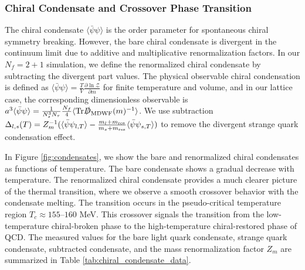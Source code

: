 \subsubsection*{Chiral Condensate and Crossover Phase Transition}
The chiral condensate $\langle \bar{\psi}\psi \rangle$ is the order parameter for spontaneous chiral symmetry breaking. However, the bare chiral condensate is divergent in the continuum limit due to additive and multiplicative renormalization factors. In our $N_f=2+1$ simulation, we define the renormalized chiral condensate by subtracting the divergent part values. The physical observable chiral condensation is defined as $\langle \bar{\psi}\psi \rangle = \frac{T}{V} \frac{\partial \ln \mathcal{Z}}{\partial m}$ for finite temperature and volume, and in our lattice case, the corresponding dimensionless observable is $a^3 \langle \bar{\psi}\psi \rangle = \frac{1}{N_s^3 N_\tau} \frac{N_f}{4} \langle \mathrm{Tr} \slashed{D}_{\mathrm{MDWF}}(m)^{-1} \rangle$. We use subtraction $\Delta_{l,s}(T) = Z^{-1}_m( \langle \bar{\psi}\psi_{l,T} \rangle - \frac{m_l+ m_{\rm res}}{m_s+m_{\rm res}} \langle \bar{\psi}\psi_{s,T} \rangle)$ to remove the divergent strange quark condensation effect.

In Figure \ref{fig:condensates}, we show the bare and renormalized chiral condensates as functions of temperature. The bare condensate shows a gradual decrease with temperature. The renormalized chiral condensate provides a much clearer picture of the thermal transition, where we observe a smooth crossover behavior with the condensate melting. The transition occurs in the pseudo-critical temperature region $T_c \approx 155\text{--}160$ MeV. This crossover signals the transition from the low-temperature chiral-broken phase to the high-temperature chiral-restored phase of QCD. The measured values for the bare light quark condensate, strange quark condensate, subtracted condensate, and the mass renormalization factor $Z_m$ are summarized in Table \ref{tab:chiral_condensate_data}.

